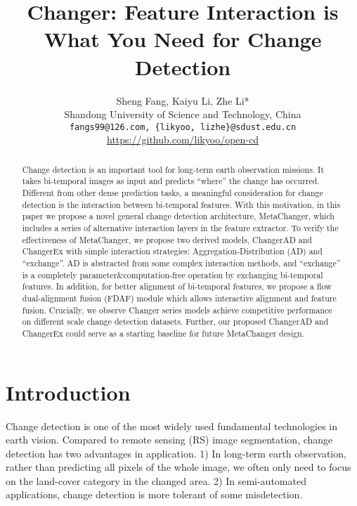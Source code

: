 \documentclass[10pt,twocolumn,letterpaper]{article}
\begin{document}
\title{Changer: Feature Interaction is What You Need for Change Detection}

\author{Sheng Fang, Kaiyu Li, Zhe Li*\\
Shandong University of Science and Technology, China\\
{\tt\small fangs99@126.com, \{likyoo, lizhe\}@sdust.edu.cn}
\\
\url{https://github.com/likyoo/open-cd}
}
\maketitle

\begin{abstract}
Change detection is an important tool for long-term earth observation missions. It takes bi-temporal images as input and predicts ``where'' the change has occurred. Different from other dense prediction tasks, a meaningful consideration for change detection is the interaction between bi-temporal features. With this motivation, in this paper we propose a novel general change detection architecture, MetaChanger, which includes a series of alternative interaction layers in the feature extractor. To verify the effectiveness of MetaChanger, we propose two derived models, ChangerAD and ChangerEx with simple interaction strategies: 
Aggregation-Distribution (AD) and ``exchange''. AD is abstracted from some complex interaction methods, and ``exchange'' is a completely parameter\&computation-free operation by exchanging bi-temporal features. In addition, for better alignment of bi-temporal features, we propose a flow dual-alignment fusion (FDAF) module which allows interactive alignment and feature fusion. Crucially, we observe Changer series models achieve competitive performance on different scale change detection datasets. Further, our proposed ChangerAD and ChangerEx could serve as a starting baseline for future MetaChanger design.
\end{abstract}


\section{Introduction}
\label{sec:intro}
Change detection is one of the most widely used fundamental technologies in earth vision. Compared to remote sensing (RS) image segmentation, change detection has two advantages in application.
1) In long-term earth observation, rather than predicting all pixels of the whole image, we often only need to focus on the land-cover category in the changed area.
2) In semi-automated applications, change detection is more tolerant of some misdetection.
\end{document}
